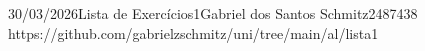 \documentclass{article}
\begin{document}
{30/03/2026}{Lista de Exercícios}{1}{Gabriel dos Santos Schmitz}{2487438}
{https://github.com/gabrielzschmitz/uni/tree/main/al/lista1}




\newpage
\printbibliography\
\end{document}
